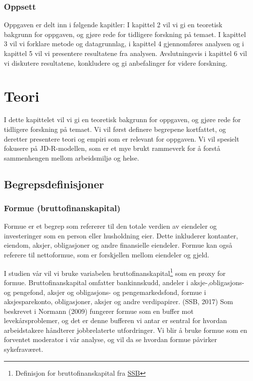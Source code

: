 \documentclass[
  12pt,
  a4paper,
  DIV=11,
  numbers=noendperiod]{scrartcl}
\begin{document}
\subsubsection{Oppsett}\label{oppsett}

Oppgaven er delt inn i følgende kapitler: I kapittel 2 vil vi gi en
teoretisk bakgrunn for oppgaven, og gjøre rede for tidligere forskning
på temaet. I kapittel 3 vil vi forklare metode og datagrunnlag, i
kapittel 4 gjennomføres analysen og i kapittel 5 vil vi presentere
resultatene fra analysen. Avslutningsvis i kapittel 6 vil vi diskutere
resultatene, konkludere og gi anbefalinger for videre forskning.

\section{Teori}\label{teori}

I dette kapittelet vil vi gi en teoretisk bakgrunn for oppgaven, og
gjøre rede for tidligere forskning på temaet. Vi vil først definere
begrepene kortfattet, og deretter presentere teori og empiri som er
relevant for oppgaven. Vi vil spesielt fokusere på JD-R-modellen, som er
et mye brukt rammeverk for å forstå sammenhengen mellom arbeidsmiljø og
helse.

\subsection{Begrepsdefinisjoner}\label{begrepsdefinisjoner}

\subsubsection{Formue
(bruttofinanskapital)}\label{formue-bruttofinanskapital}

Formue er et begrep som refererer til den totale verdien av eiendeler og
investeringer som en person eller husholdning eier. Dette inkluderer
kontanter, eiendom, aksjer, obligasjoner og andre finansielle eiendeler.
Formue kan også referere til nettoformue, som er forskjellen mellom
eiendeler og gjeld.

I studien vår vil vi bruke variabelen bruttofinanskapital\footnote{Definisjon
  for bruttofinanskapital fra
  \href{https://www.ssb.no/a/metadata/conceptvariable/vardok/3449/nb}{SSB}}
som en proxy for formue. Bruttofinanskapital omfatter bankinnskudd,
andeler i aksje-,obligasjons- og pengefond, aksjer og obligasjons- og
pengemarkedsfond, formue i aksjesparekonto, obligasjoner, aksjer og
andre verdipapirer. (SSB, 2017) Som beskrevet i Normann (2009) fungerer
formue som en buffer mot levekårsproblemer, og det er denne bufferen vi
antar er sentral for hvordan arbeidstakere håndterer jobbrelaterte
utfordringer. Vi blir å bruke formue som en forventet moderator i vår
analyse, og vil da se hvordan formue påvirker sykefraværet.
\end{document}
